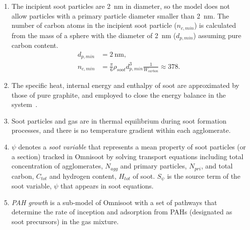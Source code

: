 \begin{enumerate}
\item The incipient soot particles are 2~nm in diameter, so the model does not allow particles with a primary particle diameter smaller than 2~nm. The number of carbon atoms in the incipient soot particle ($n_{c,min}$) is calculated from the mass of a sphere with the diameter of 2~nm ($d_{p,min}$) assuming pure carbon content.
\begin{equation}
	\begin{split}
	d_{p,min}&=2~\mathrm{nm}, \\
	n_{c,min}& =\frac{\pi}{6}\rho_{soot}d^3_{p,min}\frac{1}{W_{carbon}}\approx378
	\label{eqn:dp_min}.
	\end{split}
\end{equation}

\item The specific heat, internal energy and enthalpy of soot are approximated by those of pure graphite, and employed to close the energy balance in the system~\cite{mcbride1993coefficients}.

\item Soot particles and gas are in thermal equilibrium during soot formation processes, and there is no temperature gradient within each agglomerate.


\item $\psi$ denotes a \textit{soot variable} that represents a mean property of soot particles (or a section) tracked in Omnisoot by solving transport equations including total concentration of agglomerates, $N_{agg}$ and primary particles, $N_{pri}$, and total carbon, $C_{tot}$ and hydrogen content, $H_{tot}$ of soot. $S_{\psi}$ is the source term of the soot variable, $\psi$ that appears in soot equations. %

\item \textit{PAH growth} is a sub-model of Omnisoot with a set of pathways that determine the rate of inception and adsorption from PAHs (designated as soot precursors) in the gas mixture.


\end{enumerate}
